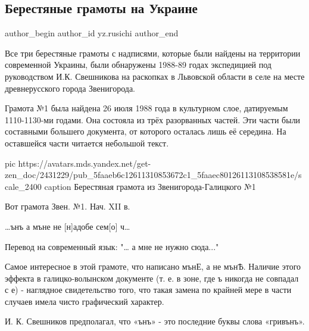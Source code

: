  
 
 
 
 
 
\subsection{Берестяные грамоты на Украине}
\label{sec:10_11_2020.sites.ru.zen_yandex.yz.rusichi.1.beresta_gramoty_ukraina}
\ifcmt
	author_begin
   author_id yz.rusichi
	author_end
\fi

Все три берестяные грамоты с надписями, которые были найдены на территории
современной Украины, были обнаружены 1988-89 годах экспедицией под руководством
И.К. Свешникова на раскопках в Львовской области в селе на месте древнерусского
города Звенигорода.

Грамота №1 была найдена 26 июля 1988 года в культурном слое, датируемым
1110-1130-ми годами. Она состояла из трёх разорванных частей. Эти части были
составными большего документа, от которого осталась лишь её середина. На
оставшейся части читается небольшой текст.

\ifcmt
  pic https://avatars.mds.yandex.net/get-zen_doc/2431229/pub_5faaeb6c12611310853672c1_5faaec80126113108538581e/scale_2400
  caption Берестяная грамота из Звенигорода-Галицкого №1
\fi

Вот грамота Звен. №1. Нач. XII в.

…ънъ а мъне не [н]адобе сем[о] ч…

Перевод на современный язык: "… а мне не нужно сюда..."

Самое интересное в этой грамоте, что написано мънЕ, а не мънѢ. Наличие этого
эффекта в галицко-волынском документе (т. е. в зоне, где ъ никогда не совпадал
с е) - наглядное свидетельство того, что такая замена по крайней мере в
части случаев имела чисто графический характер.

И. К. Свешников предполагал, что «ънъ» - это последние буквы слова «гривънъ».

